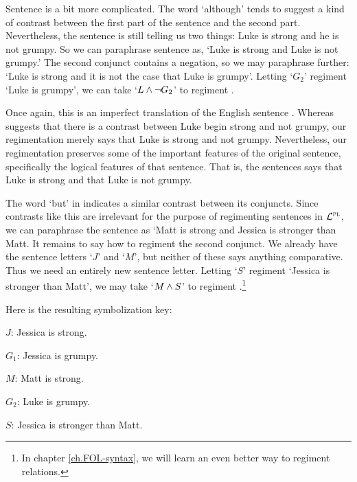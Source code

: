 Sentence  is a bit more complicated.
The word `although' tends to suggest a kind of contrast between the first part of the sentence and the second part.
Nevertheless, the sentence is still telling us two things: Luke is strong and he is not grumpy.
So we can paraphrase sentence  as, `Luke is strong and Luke is not grumpy.'
The second conjunct contains a negation, so we may paraphrase further: `Luke is strong and it is not the case that Luke is grumpy'.
Letting `$G_{2}$' regiment `Luke is grumpy', we can take `$L\wedge\neg G_{2}$' to regiment .

Once again, this is an imperfect translation of the English sentence .
Whereas  suggests that there is a contrast between Luke begin strong and not grumpy, our regimentation merely says that Luke is strong and not grumpy.
Nevertheless, our regimentation preserves some of the important features of the original sentence, specifically the logical features of that sentence.
That is, the sentences says that Luke is strong and that Luke is not grumpy.

The word `but' in  indicates a similar contrast between its conjuncts.
Since contrasts like this are irrelevant for the purpose of regimenting sentences in $\mathcal{L}^{\textsc{pl}}$, we can paraphrase the sentence as `Matt is strong and Jessica is stronger than Matt.
It remains to say how to regiment the second conjunct.
We already have the sentence letters `$J$' and `$M$', but neither of these says anything comparative.
Thus we need an entirely new sentence letter.
Letting `$S$' regiment `Jessica is stronger than Matt', we may take `$M \wedge S$' to regiment .\footnote{In chapter \ref{ch.FOL-syntax}, we will learn an even better way to regiment relations.}

Here is the resulting symbolization key:

\begin{ekey}
  \item[$J$:] Jessica is strong.
  \item[$G_1$:] Jessica is grumpy.
  \item[$M$:] Matt is strong.
  \item[$G_2$:] Luke is grumpy.
  \item[$S$:] Jessica is stronger than Matt.
\end{ekey}


